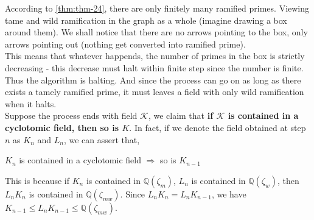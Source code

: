     According to \autoref{thm:thm-24}, there are only finitely many ramified primes. Viewing tame and wild ramification in the graph as a whole (imagine drawing a box around them). We shall notice that there are no arrows pointing to the box, only arrows pointing out (nothing get converted into ramified prime).\\
    This means that whatever happends, the number of primes in the box is strictly decreasing - this decrease must halt within finite step since the number is finite. Thus the algorithm is halting. And since the process can go on as long as there exists a tamely ramified prime, it must leaves a field with only wild ramification when it halts.\\
    Suppose the process ends with field $\mathscr{K}$, we claim that \textbf{if $\mathscr{K}$ is contained in a cyclotomic field, then so is $K$}. In fact, if we denote the field obtained at step $n$ as $K_n$ and $L_n$, we can assert that,
    \begin{center}
        $K_n$ is contained in a cyclotomic field $\Rightarrow$ so is $K_{n-1}$
    \end{center}
    This is because if $K_n$ is contained in $\mathbb{Q}(\zeta_m)$, $L_n$ is contained in $\mathbb{Q}(\zeta_w)$, then $L_n K_n$ is contained in $\mathbb{Q}(\zeta_{mw})$. Since $L_n K_n = L_n K_{n-1}$, we have $K_{n-1} \leq L_n K_{n-1} \leq \mathbb{Q}(\zeta_{mw})$.
    \begin{center}
    \end{center}
